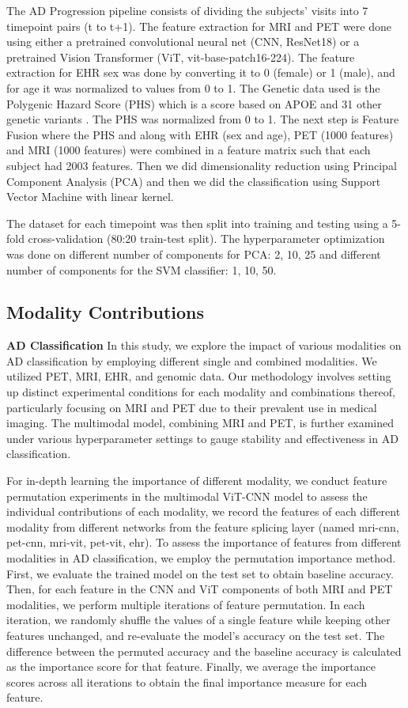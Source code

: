The AD Progression pipeline consists of dividing the subjects’ visits into 7 timepoint pairs (t to t+1). The feature extraction for MRI and PET were done using either a pretrained convolutional neural net (CNN, ResNet18) or a pretrained Vision Transformer (ViT, vit-base-patch16-224). The feature extraction for EHR sex was done by converting it to 0 (female) or 1 (male), and for age it was normalized to values from 0 to 1. The Genetic data used is the Polygenic Hazard Score (PHS) which is a score based on APOE and 31 other genetic variants \cite{desikan_genetic_2017}. The PHS was normalized from 0 to 1. The next step is Feature Fusion where the PHS and along with EHR (sex and age), PET (1000 features) and MRI (1000 features) were combined in a feature matrix such that each subject had 2003 features. Then we did dimensionality reduction using Principal Component Analysis (PCA) and then we did the classification using Support Vector Machine with linear kernel.  

The dataset for each timepoint was then split into training and testing using a 5-fold cross-validation (80:20 train-test split). The hyperparameter optimization was done on different number of components for PCA: 2, 10, 25 and different number of components for the SVM classifier: 1, 10, 50. 

\subsection{Modality Contributions}
\textbf{AD Classification}
In this study, we explore the impact of various modalities on AD classification by employing different single and combined modalities. We utilized PET, MRI, EHR, and genomic data. Our methodology involves setting up distinct experimental conditions for each modality and combinations thereof, particularly focusing on MRI and PET due to their prevalent use in medical imaging. The multimodal model, combining MRI and PET, is further examined under various hyperparameter settings to gauge stability and effectiveness in AD classification. 

For in-depth learning the importance of different modality, we conduct feature permutation experiments in the multimodal ViT-CNN model to assess the individual contributions of each modality, we record the features of each different modality from different networks from the feature splicing layer (named mri-cnn, pet-cnn, mri-vit, pet-vit, ehr). To assess the importance of features from different modalities in AD classification, we employ the permutation importance method. First, we evaluate the trained model on the test set to obtain baseline accuracy. Then, for each feature in the CNN and ViT components of both MRI and PET modalities, we perform multiple iterations of feature permutation. In each iteration, we randomly shuffle the values of a single feature while keeping other features unchanged, and re-evaluate the model's accuracy on the test set. The difference between the permuted accuracy and the baseline accuracy is calculated as the importance score for that feature. Finally, we average the importance scores across all iterations to obtain the final importance measure for each feature. 

